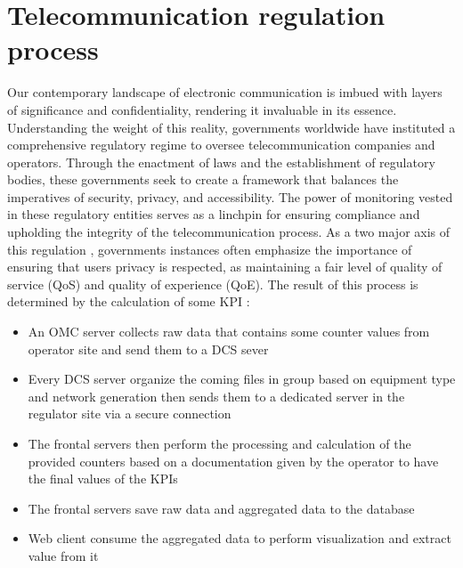 \section{Telecommunication regulation process}
Our contemporary landscape of electronic communication is imbued with layers of significance and confidentiality, rendering it invaluable in its essence. Understanding the weight of this reality, governments worldwide have instituted a comprehensive regulatory regime to oversee telecommunication companies and operators. Through the enactment of laws and the establishment of regulatory bodies, these governments seek to create a framework that balances the imperatives of security, privacy, and accessibility. The power of monitoring vested in these regulatory entities serves as a linchpin for ensuring compliance and upholding the integrity of the telecommunication process.
As a two major axis of this regulation , governments instances often emphasize the importance of ensuring that users privacy is respected, as maintaining a fair level of quality of service (QoS) and quality of experience (QoE). 
The result of this process is determined by the calculation of some KPI :
\begin{itemize}
    \renewcommand\labelitemi{\textbf{\Huge .}}
    \item  An OMC server collects raw data that contains some counter values from operator site and send them  to a DCS sever
    \item  Every DCS server organize the coming files in group based on equipment type and network generation then sends them to a dedicated server in the regulator site via a secure connection 
    \item The frontal servers then perform the processing and calculation of the provided counters based on a documentation given by the operator to have the final values of the KPIs 
    \item The frontal servers save raw data and aggregated data to the database 
    \item Web client consume the aggregated data to perform visualization and extract value from it 
    \end{itemize}

